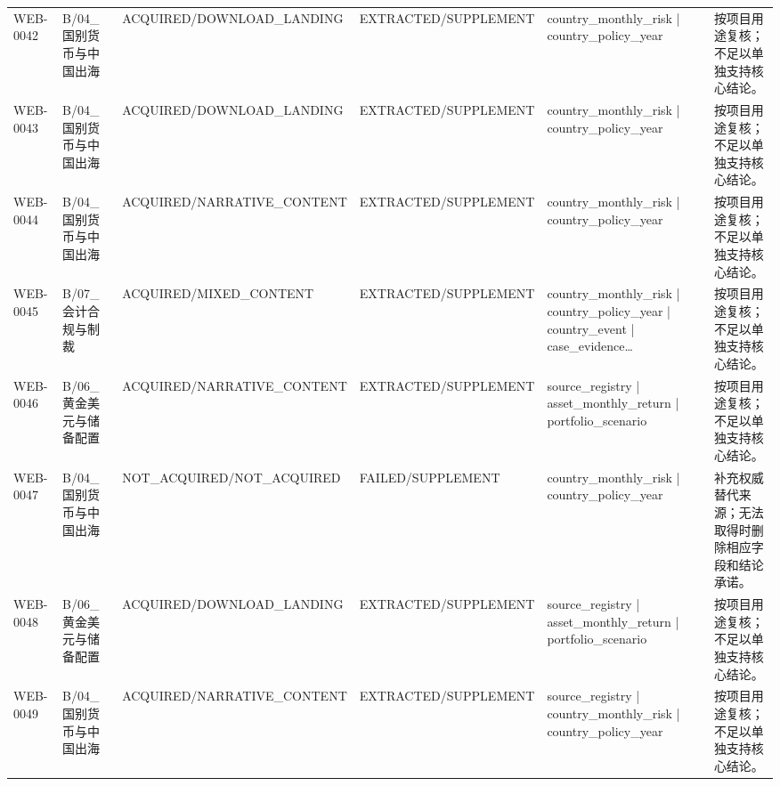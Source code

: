 \begin{landscape}
\begin{longtable}{p{1.8cm}p{2.6cm}p{2.6cm}p{2.6cm}p{4.8cm}p{7.2cm}}
WEB-0042 & B/\allowbreak{}04\_\allowbreak{}国别货币与中国出海 & ACQUIRED/\allowbreak{}DOWNLOAD\_\allowbreak{}LANDING & EXTRACTED/\allowbreak{}SUPPLEMENT & country\_\allowbreak{}monthly\_\allowbreak{}risk | country\_\allowbreak{}policy\_\allowbreak{}year & 按项目用途复核；不足以单独支持核心结论。\\
WEB-0043 & B/\allowbreak{}04\_\allowbreak{}国别货币与中国出海 & ACQUIRED/\allowbreak{}DOWNLOAD\_\allowbreak{}LANDING & EXTRACTED/\allowbreak{}SUPPLEMENT & country\_\allowbreak{}monthly\_\allowbreak{}risk | country\_\allowbreak{}policy\_\allowbreak{}year & 按项目用途复核；不足以单独支持核心结论。\\
WEB-0044 & B/\allowbreak{}04\_\allowbreak{}国别货币与中国出海 & ACQUIRED/\allowbreak{}NARRATIVE\_\allowbreak{}CONTENT & EXTRACTED/\allowbreak{}SUPPLEMENT & country\_\allowbreak{}monthly\_\allowbreak{}risk | country\_\allowbreak{}policy\_\allowbreak{}year & 按项目用途复核；不足以单独支持核心结论。\\
WEB-0045 & B/\allowbreak{}07\_\allowbreak{}会计合规与制裁 & ACQUIRED/\allowbreak{}MIXED\_\allowbreak{}CONTENT & EXTRACTED/\allowbreak{}SUPPLEMENT & country\_\allowbreak{}monthly\_\allowbreak{}risk | country\_\allowbreak{}policy\_\allowbreak{}year | country\_\allowbreak{}event | case\_\allowbreak{}evidence… & 按项目用途复核；不足以单独支持核心结论。\\
WEB-0046 & B/\allowbreak{}06\_\allowbreak{}黄金美元与储备配置 & ACQUIRED/\allowbreak{}NARRATIVE\_\allowbreak{}CONTENT & EXTRACTED/\allowbreak{}SUPPLEMENT & source\_\allowbreak{}registry | asset\_\allowbreak{}monthly\_\allowbreak{}return | portfolio\_\allowbreak{}scenario & 按项目用途复核；不足以单独支持核心结论。\\
WEB-0047 & B/\allowbreak{}04\_\allowbreak{}国别货币与中国出海 & NOT\_\allowbreak{}ACQUIRED/\allowbreak{}NOT\_\allowbreak{}ACQUIRED & FAILED/\allowbreak{}SUPPLEMENT & country\_\allowbreak{}monthly\_\allowbreak{}risk | country\_\allowbreak{}policy\_\allowbreak{}year & 补充权威替代来源；无法取得时删除相应字段和结论承诺。\\
WEB-0048 & B/\allowbreak{}06\_\allowbreak{}黄金美元与储备配置 & ACQUIRED/\allowbreak{}DOWNLOAD\_\allowbreak{}LANDING & EXTRACTED/\allowbreak{}SUPPLEMENT & source\_\allowbreak{}registry | asset\_\allowbreak{}monthly\_\allowbreak{}return | portfolio\_\allowbreak{}scenario & 按项目用途复核；不足以单独支持核心结论。\\
WEB-0049 & B/\allowbreak{}04\_\allowbreak{}国别货币与中国出海 & ACQUIRED/\allowbreak{}NARRATIVE\_\allowbreak{}CONTENT & EXTRACTED/\allowbreak{}SUPPLEMENT & source\_\allowbreak{}registry | country\_\allowbreak{}monthly\_\allowbreak{}risk | country\_\allowbreak{}policy\_\allowbreak{}year & 按项目用途复核；不足以单独支持核心结论。\\

\end{longtable}
\end{landscape}
